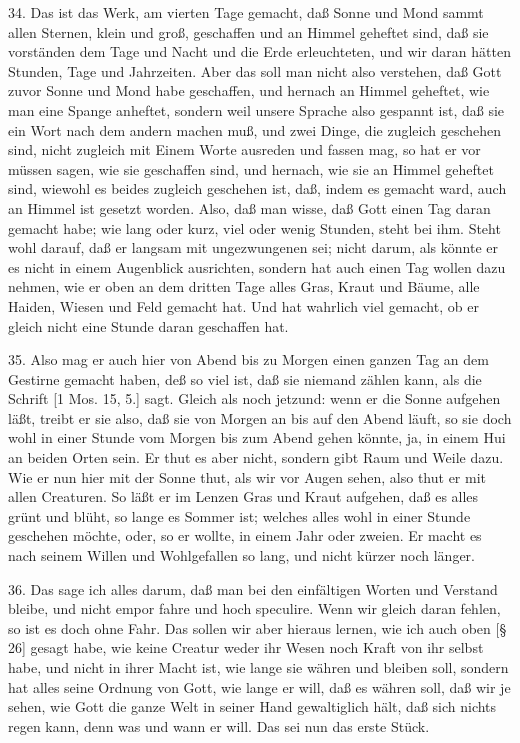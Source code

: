 34. Das ist das Werk, am vierten Tage gemacht, daß Sonne und Mond sammt allen Sternen, klein und groß, geschaffen und an Himmel geheftet sind, daß sie vorständen dem Tage und Nacht und die Erde erleuchteten, und wir daran hätten Stunden, Tage und Jahrzeiten. Aber das soll man nicht also verstehen, daß Gott zuvor Sonne und Mond habe geschaffen, und hernach an Himmel geheftet, wie man eine Spange anheftet, sondern weil unsere Sprache also gespannt ist, daß sie ein Wort nach dem andern machen muß, und zwei Dinge, die zugleich geschehen sind, nicht zugleich mit Einem Worte ausreden und fassen mag, so hat er vor müssen sagen, wie sie geschaffen sind, und hernach, wie sie an Himmel geheftet sind, wiewohl es beides zugleich geschehen ist, daß, indem es gemacht ward, auch an Himmel ist gesetzt worden. Also, daß man wisse, daß Gott einen Tag daran gemacht habe; wie lang oder kurz, viel oder wenig Stunden, steht bei ihm. Steht wohl darauf, daß er langsam mit ungezwungenen sei; nicht darum, als könnte er es nicht in einem Augenblick ausrichten, sondern hat auch einen Tag wollen dazu nehmen, wie er oben an dem dritten Tage alles Gras, Kraut und Bäume, alle Haiden, Wiesen und Feld gemacht hat. Und hat wahrlich viel gemacht, ob er gleich nicht eine Stunde daran geschaffen hat.

35. Also mag er auch hier von Abend bis zu Morgen einen ganzen Tag an dem Gestirne gemacht haben, deß so viel ist, daß sie niemand zählen kann, als die Schrift [1 Mos. 15, 5.] sagt. Gleich als noch jetzund: wenn er die Sonne aufgehen läßt, treibt er sie also, daß sie von Morgen an bis auf den Abend läuft, so sie doch wohl in einer Stunde vom Morgen bis zum Abend gehen könnte, ja, in einem Hui an beiden Orten sein. Er thut es aber nicht, sondern gibt Raum und Weile dazu. Wie er nun hier mit der Sonne thut, als wir vor Augen sehen, also thut er mit allen Creaturen. So läßt er im Lenzen Gras und Kraut aufgehen, daß es alles grünt und blüht, so lange es Sommer ist; welches alles wohl in einer Stunde geschehen möchte, oder, so er wollte, in einem Jahr oder zweien. Er macht es nach seinem Willen und Wohlgefallen so lang, und nicht kürzer noch länger.

36. Das sage ich alles darum, daß man bei den einfältigen Worten und Verstand bleibe, und nicht empor fahre und hoch speculire. Wenn wir gleich daran fehlen, so ist es doch ohne Fahr. Das sollen wir aber hieraus lernen, wie ich auch oben [§ 26] gesagt habe, wie keine Creatur weder ihr Wesen noch Kraft von ihr selbst habe, und nicht in ihrer Macht ist, wie lange sie währen und bleiben soll, sondern hat alles seine Ordnung von Gott, wie lange er will, daß es währen soll, daß wir je sehen, wie Gott die ganze Welt in seiner Hand gewaltiglich hält, daß sich nichts regen kann, denn was und wann er will. Das sei nun das erste Stück.

